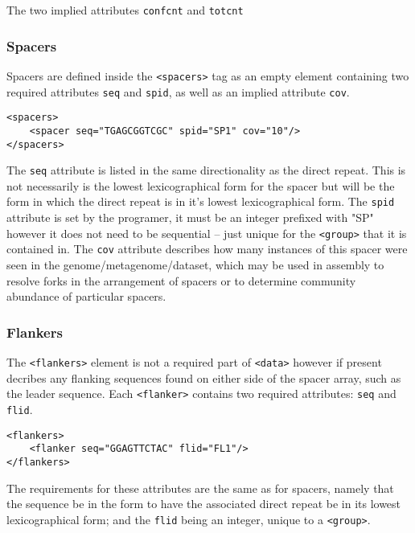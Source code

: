 \documentclass[11pt]{article} %
\begin{document}
The two implied attributes \lstinline[language=XML_new]$confcnt$ and \lstinline[language=XML_new]$totcnt$

\subsubsection{Spacers}
Spacers are defined inside the \lstinline[language=XML_new]$<spacers>$ tag as an empty element containing two required attributes \lstinline[language=XML_new]$seq$ and \lstinline[language=XML_new]$spid$, as well as an implied attribute \lstinline[language=XML_new]$cov$.
\begin{lstlisting}[language=XML_new]
<spacers>
	<spacer seq="TGAGCGGTCGC" spid="SP1" cov="10"/>
</spacers>
\end{lstlisting}
The \lstinline[language=XML_new]$seq$ attribute is listed in the same directionality as the direct repeat.  This is not necessarily is the lowest lexicographical form for the spacer but will be the form in which the direct repeat is in it's lowest lexicographical form.  The \lstinline[language=XML_new]$spid$ attribute is set by the programer, it must be an integer prefixed with "SP" however it does not need to be sequential -- just unique for the \lstinline[language=XML_new]$<group>$ that it is contained in.  The \lstinline[language=XML_new]$cov$ attribute describes how many instances of this spacer were seen in the genome/metagenome/dataset, which may be used in assembly to resolve forks in the arrangement of spacers or to determine community abundance of particular spacers. 
\subsubsection{Flankers}
The \lstinline[language=XML_new]$<flankers>$ element is not a required part of \lstinline[language=XML_new]$<data>$ however if present decribes any flanking sequences found on either side of the spacer array, such as the leader sequence. Each \lstinline[language=XML_new]$<flanker>$ contains two required attributes: \lstinline[language=XML_new]$seq$ and \lstinline[language=XML_new]$flid$.
\begin{lstlisting}[language=XML_new]
<flankers>
	<flanker seq="GGAGTTCTAC" flid="FL1"/>
</flankers>
\end{lstlisting}
The requirements for these attributes are the same as for spacers, namely that the sequence be in the form to have the associated direct repeat be in its lowest lexicographical form; and the \lstinline[language=XML_new]$flid$ being an integer, unique to a \lstinline[language=XML_new]$<group>$.
\end{document}
